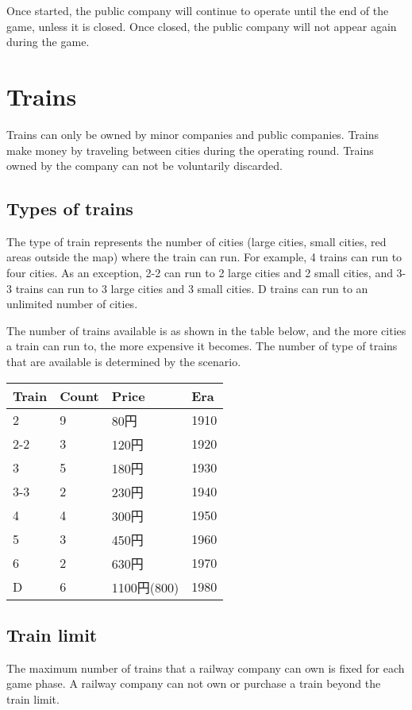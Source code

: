 \documentclass{article}
\begin{document}
\begin{CJK}{UTF8}{min}
\begin{multicols}{2}
Once started, the public company will continue to operate until the
end of the game, unless it is closed. Once closed, the public company
will not appear again during the game.



\section{Trains}

Trains can only be owned by minor companies and public
companies. Trains make money by traveling between cities during the
operating round. Trains owned by the company can not be voluntarily
discarded.

\subsection{Types of trains}
\label{sec:train-types}
The type of train represents the number of cities (large cities, small
cities, red areas outside the map) where the train can run. For
example, 4 trains can run to four cities. As an exception, 2-2 can run
to 2 large cities and 2 small cities, and 3-3 trains can run to 3
large cities and 3 small cities. D trains can run to an unlimited
number of cities.

The number of trains available is as shown in the table below, and the
more cities a train can run to, the more expensive it becomes. The
number of type of trains that are available is determined by the
scenario.

\begin{tabular}{|l|l|l|l|}
\hline
Train & Count & Price & Era \\
\hline
2 & 9 & 80円 & 1910 \\
2-2 & 3 & 120円 & 1920 \\
3 & 5 & 180円 & 1930 \\
3-3 & 2 & 230円 & 1940 \\
4 & 4 & 300円 & 1950 \\
5 & 3 & 450円 & 1960 \\
6 & 2 & 630円 & 1970 \\
D & 6 & 1100円(800) & 1980 \\
\hline
\end{tabular}

\subsection{Train limit}

The maximum number of trains that a railway company can own is fixed
for each game phase. A railway company can not own or purchase a
train beyond the train limit.


\end{multicols}
\end{CJK}
\end{document}
